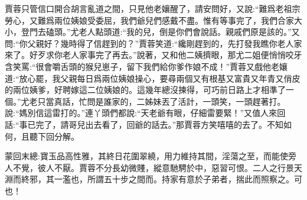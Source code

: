 \begin{parag}
    賈蓉只管信口開合胡言亂道之間，只見他老孃醒了，請安問好，又說:“難爲老祖宗勞心，又難爲兩位姨娘受委屈，我們爺兒們感戴不盡。惟有等事完了，我們合家大小，登門去磕頭。”尤老人點頭道:“我的兒，倒是你們會說話。親戚們原是該的。”又問:“你父親好？幾時得了信趕到的？”賈蓉笑道:“纔剛趕到的，先打發我瞧你老人家來了。好歹求你老人家事完了再去。”說著，又和他二姨擠眼，那尤二姐便悄悄咬牙含笑罵:“很會嚼舌頭的猴兒崽子，留下我們給你爹作娘不成！”賈蓉又戲他老孃道:“放心罷，我父親每日爲兩位姨娘操心，要尋兩個又有根基又富貴又年青又俏皮的兩位姨爹，好聘嫁這二位姨娘的。這幾年總沒揀得，可巧前日路上才相準了一個。”尤老只當真話，忙問是誰家的，二姊妹丟了活計，一頭笑，一頭趕著打。說:“媽別信這雷打的。”連丫頭們都說:“天老爺有眼，仔細雷要緊！”又值人來回話:“事已完了，請哥兒出去看了，回爺的話去。”那賈蓉方笑嘻嘻的去了。不知如何，且聽下回分解。
\end{parag}


\begin{parag}
    \begin{note}蒙回末總:寶玉品高性雅，其終日花圍翠繞，用力維持其間，淫蕩之至，而能使旁人不覺，彼人不厭。賈蓉不分長幼微賤，縱意馳騁於中，惡習可恨。二人之行景天淵而終邪，其一濫也，所謂五十步之間而。持家有意於子弟者，揣此而照察之。可也！\end{note}
\end{parag}

